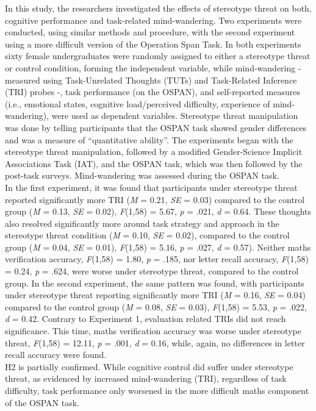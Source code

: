 \documentclass[
  stu,floatsintext]{apa7}
\begin{document}
In this study, the researchers investigated the effects of stereotype threat on both, cognitive performance and task-related mind-wandering.
Two experiments were conducted, using similar methods and procedure, with the second experiment using a more difficult version of the Operation Span Task.
In both experiments sixty female undergraduates were randomly assigned to either a stereotype threat or control condition, forming the independent variable, while mind-wandering - measured using Task-Unrelated Thoughts (TUTs) and Task-Related Inference (TRI) probes -, task performance (on the OSPAN), and self-reported measures (i.e., emotional states, cognitive load/perceived difficulty, experience of mind-wandering), were used as dependent variables.
Stereotype threat manipulation was done by telling participants that the OSPAN task showed gender differences and was a measure of ``quantitative ability''.
The experiments began with the stereotype threat manipulation, followed by a modified Gender-Science Implicit Associations Task (IAT), and the OSPAN task, which was then followed by the post-task surveys.
Mind-wandering was assessed during the OSPAN task.\\
In the first experiment, it was found that participants under stereotype threat reported significantly more TRI (\emph{M} = 0.21, \emph{SE} = 0.03) compared to the control group (\emph{M} = 0.13, \emph{SE} = 0.02), \emph{F}(1,58) = 5.67, \emph{p} = .021, \emph{d} = 0.64.
These thoughts also resolved significantly more around task strategy and approach in the stereotype threat condition (\emph{M} = 0.10, \emph{SE} = 0.02), compared to the control group (\emph{M} = 0.04, \emph{SE} = 0.01), \emph{F}(1,58) = 5.16, \emph{p} = .027, \emph{d} = 0.57).
Neither maths verification accuracy, \emph{F}(1,58) = 1.80, \emph{p} = .185, nor letter recall accuracy, \emph{F}(1,58) = 0.24, \emph{p} = .624, were worse under stereotype threat, compared to the control group.
In the second experiment, the same pattern was found, with participants under stereotype threat reporting significantly more TRI (\emph{M} = 0.16, \emph{SE} = 0.04) compared to the control group (\emph{M} = 0.08, \emph{SE} = 0.03), \emph{F}(1,58) = 5.53, \emph{p} = .022, \emph{d} = 0.42.
Contrary to Experiment 1, evaluation related TRIs did not reach significance.
This time, maths verification accuracy was worse under stereotype threat, \emph{F}(1,58) = 12.11, \emph{p} = .001, \emph{d} = 0.16, while, again, no differences in letter recall accuracy were found.\\
H2 is partially confirmed. While cognitive control did suffer under stereotype threat, as evidenced by increased mind-wandering (TRI), regardless of task difficulty, task performance only worsened in the more difficult maths component of the OSPAN task.
\end{document}
